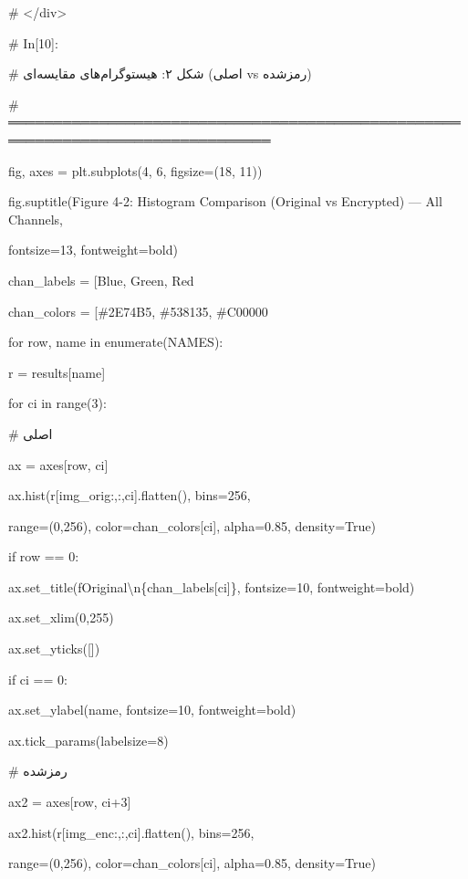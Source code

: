 \# \textless/div\textgreater{}

\# In{[}10{]}:

\# شکل ۲: هیستوگرام‌های مقایسه‌ای (اصلی vs رمزشده)

\# ═══════════════════════════════════════════════════════════════════════════════

fig, axes = plt.subplots(4, 6, figsize=(18, 11))

fig.suptitle(\textquotesingle Figure 4-2: Histogram Comparison (Original vs Encrypted) --- All Channels\textquotesingle,

fontsize=13, fontweight=\textquotesingle bold\textquotesingle)

chan\_labels = {[}\textquotesingle Blue\textquotesingle, \textquotesingle Green\textquotesingle, \textquotesingle Red\textquotesingle{]}

chan\_colors = {[}\textquotesingle\#2E74B5\textquotesingle, \textquotesingle\#538135\textquotesingle, \textquotesingle\#C00000\textquotesingle{]}

for row, name in enumerate(NAMES):

r = results{[}name{]}

for ci in range(3):

\# اصلی

ax = axes{[}row, ci{]}

ax.hist(r{[}\textquotesingle img\_orig\textquotesingle{]}{[}:,:,ci{]}.flatten(), bins=256,

range=(0,256), color=chan\_colors{[}ci{]}, alpha=0.85, density=True)

if row == 0:

ax.set\_title(f\textquotesingle Original\textbackslash n\{chan\_labels{[}ci{]}\}\textquotesingle, fontsize=10, fontweight=\textquotesingle bold\textquotesingle)

ax.set\_xlim(0,255)

ax.set\_yticks({[}{]})

if ci == 0:

ax.set\_ylabel(name, fontsize=10, fontweight=\textquotesingle bold\textquotesingle)

ax.tick\_params(labelsize=8)

\# رمزشده

ax2 = axes{[}row, ci+3{]}

ax2.hist(r{[}\textquotesingle img\_enc\textquotesingle{]}{[}:,:,ci{]}.flatten(), bins=256,

range=(0,256), color=chan\_colors{[}ci{]}, alpha=0.85, density=True)

